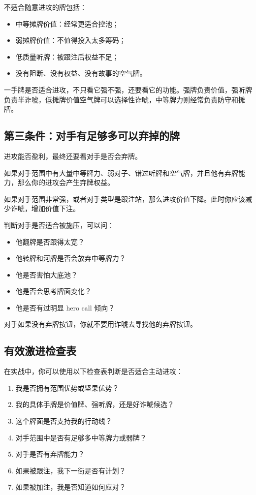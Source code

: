不适合随意进攻的牌包括：

\begin{itemize}
\item 中等摊牌价值：经常更适合控池；
\item 弱摊牌价值：不值得投入太多筹码；
\item 低质量听牌：被跟注后权益不足；
\item 没有阻断、没有权益、没有故事的空气牌。
\end{itemize}

一手牌是否适合进攻，不只看它强不强，还要看它的功能。强牌负责价值，强听牌负责半诈唬，低摊牌价值空气牌可以选择性诈唬，中等牌力则经常负责防守和摊牌。

\subsection{第三条件：对手有足够多可以弃掉的牌}

进攻能否盈利，最终还要看对手是否会弃牌。

如果对手范围中有大量中等牌力、弱对子、错过听牌和空气牌，并且他有弃牌能力，那么你的进攻会产生弃牌权益。

如果对手范围非常强，或者对手类型是跟注站，那么进攻价值下降。此时你应该减少诈唬，增加价值下注。

判断对手是否适合被施压，可以问：

\begin{itemize}
\item 他翻牌是否跟得太宽？
\item 他转牌和河牌是否会放弃中等牌力？
\item 他是否害怕大底池？
\item 他是否会思考牌面变化？
\item 他是否有过明显 hero call 倾向？
\end{itemize}

对手如果没有弃牌按钮，你就不要用诈唬去寻找他的弃牌按钮。

\subsection{有效激进检查表}

在实战中，你可以使用以下检查表判断是否适合主动进攻：

\begin{enumerate}
\item 我是否拥有范围优势或坚果优势？
\item 我的具体手牌是价值牌、强听牌，还是好诈唬候选？
\item 这个牌面是否支持我的行动线？
\item 对手范围中是否有足够多中等牌力或弱牌？
\item 对手是否有弃牌能力？
\item 如果被跟注，我下一街是否有计划？
\item 如果被加注，我是否知道如何应对？
\end{enumerate}

